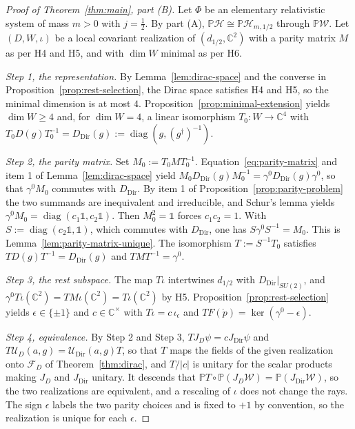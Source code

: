 \begin{proof}[Proof of Theorem~\ref{thm:main}, part (B)]
	Let $\Phi$ be an elementary relativistic system of mass $m>0$ with $j=\tfrac12$. By part (A), $\mathbb{P}\mathcal{H}\cong\mathbb{P}\mathcal{H}_{m,1/2}$ through $\mathbb{P}\mathcal{W}$. Let $(D,W,\iota)$ be a local covariant realization of $(d_{1/2},\mathbb{C}^2)$ with a parity matrix $M$ as per H4 and H5, and with $\dim W$ minimal as per H6.
	
	\emph{Step 1, the representation.} By Lemma~\ref{lem:dirac-space} and the converse in Proposition~\ref{prop:rest-selection}, the Dirac space satisfies H4 and H5, so the minimal dimension is at most $4$. Proposition~\ref{prop:minimal-extension} yields $\dim W\geq4$ and, for $\dim W=4$, a linear isomorphism $T_0:W\to\mathbb{C}^4$ with $T_0D(g)T_0^{-1}=D_{\mathrm{Dir}}(g):=\operatorname{diag}(g,(g^\dagger)^{-1})$.
	
	\emph{Step 2, the parity matrix.} Set $M_0:=T_0MT_0^{-1}$. Equation~\eqref{eq:parity-matrix} and item 1 of Lemma~\ref{lem:dirac-space} yield $M_0D_{\mathrm{Dir}}(g)M_0^{-1}=\gamma^0D_{\mathrm{Dir}}(g)\gamma^0$, so that $\gamma^0M_0$ commutes with $D_{\mathrm{Dir}}$. By item 1 of Proposition~\ref{prop:parity-problem} the two summands are inequivalent and irreducible, and Schur's lemma yields $\gamma^0M_0=\operatorname{diag}(c_1\mathbb{1},c_2\mathbb{1})$. Then $M_0^2=\mathbb{1}$ forces $c_1c_2=1$. With $S:=\operatorname{diag}(c_2\mathbb{1},\mathbb{1})$, which commutes with $D_{\mathrm{Dir}}$, one has $S\gamma^0S^{-1}=M_0$. This is Lemma~\ref{lem:parity-matrix-unique}. The isomorphism $T:=S^{-1}T_0$ satisfies $TD(g)T^{-1}=D_{\mathrm{Dir}}(g)$ and $TMT^{-1}=\gamma^0$.
	
	\emph{Step 3, the rest subspace.} The map $T\iota$ intertwines $d_{1/2}$ with $D_{\mathrm{Dir}}|_{SU(2)}$, and $\gamma^0T\iota(\mathbb{C}^2)=TM\iota(\mathbb{C}^2)=T\iota(\mathbb{C}^2)$ by H5. Proposition~\ref{prop:rest-selection} yields $\epsilon\in\{\pm1\}$ and $c\in\mathbb{C}^\times$ with $T\iota=c\,\iota_\epsilon$ and $TF(\mathring{p})=\ker(\gamma^0-\epsilon)$.
	
	\emph{Step 4, equivalence.} By Step 2 and Step 3, $TJ_D\psi=cJ_{\mathrm{Dir}}\psi$ and $T\mathcal{U}_D(a,g)=\mathcal{U}_{\mathrm{Dir}}(a,g)T$, so that $T$ maps the fields of the given realization onto $\mathcal{F}_D$ of Theorem~\ref{thm:dirac}, and $T/|c|$ is unitary for the scalar products making $J_D$ and $J_{\mathrm{Dir}}$ unitary. It descends that $\mathbb{P}T\circ\mathbb{P}(J_D\mathcal{W})=\mathbb{P}(J_{\mathrm{Dir}}\mathcal{W})$, so the two realizations are equivalent, and a rescaling of $\iota$ does not change the rays. The sign $\epsilon$ labels the two parity choices and is fixed to $+1$ by convention, so the realization is unique for each $\epsilon$.
	

\end{proof}
